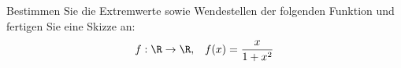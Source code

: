\begin{ExerciseBlock}
Bestimmen Sie die Extremwerte sowie Wendestellen der folgenden Funktion und fertigen Sie eine Skizze an:
\begin{equation*}
	f:\R \rightarrow \R, \;\;\; f(x)=\frac{x}{1+x^2}
\end{equation*}

\end{ExerciseBlock}
